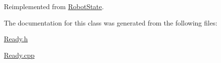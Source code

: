 Reimplemented from \mbox{\hyperlink{class_robot_state_a58fdf53d3f27201879d4dbf7aaef7ca1}{Robot\+State}}.



The documentation for this class was generated from the following files\+:\begin{DoxyCompactItemize}
\item 
\mbox{\hyperlink{_ready_8h}{Ready.\+h}}\item 
\mbox{\hyperlink{_ready_8cpp}{Ready.\+cpp}}\end{DoxyCompactItemize}
